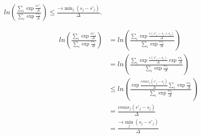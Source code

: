 \begin{lemma}
    \label{priv-inequality}
    $ln\left(\frac{\sum_{i} \exp{\frac{\epsilon s'_i}{\Delta}}}{\sum_{i} \exp{\frac{\epsilon s_i}{\Delta}}}\right) \leq \frac{-\epsilon \min_j (s_j - s'_j)}{\Delta}$.
\end{lemma}

\begin{align*}
    ln\left(\frac{\sum_{i} \exp{\frac{\epsilon s'_i}{\Delta}}}{\sum_{i} \exp{\frac{\epsilon s_i}{\Delta}}}\right)
    &= ln\left(\frac{\sum_{i} \exp{\frac{\epsilon (s'_i - s_i + s_i)}{\Delta}}}{\sum_{i} \exp{\frac{\epsilon s_i}{\Delta}}}\right) \\
    &= ln\left(\frac{\sum_{i} \exp{\frac{\epsilon (s'_i - s_i)}{\Delta}}\exp{\frac{\epsilon s_i}{\Delta}}}{\sum_{i} \exp{\frac{\epsilon s_i}{\Delta}}}\right) \\
    &\leq ln\left(\frac{\exp{\frac{\epsilon max_j(s'_j - s_j)}{\Delta}} \sum_{i} \exp{\frac{\epsilon s_i}{\Delta}}}{\sum_{i} \exp{\frac{\epsilon s_i}{\Delta}}}\right) \\
    &= \frac{\epsilon max_j(s'_j - s_j)}{\Delta} \\
    &= \frac{-\epsilon \min_j (s_j - s'_j)}{\Delta}
\end{align*}






